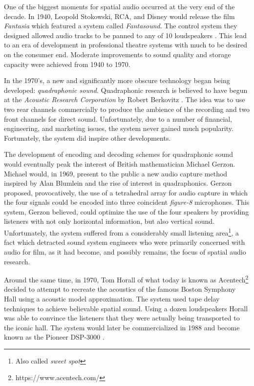 One of the biggest moments for spatial audio occurred at the very end of the decade. In 1940, Leopold Stokowski, RCA, and Disney would release the film \textit{Fantasia} which featured a system called \textit{Fantasound}. The control system they designed allowed audio tracks to be panned to any of 10 loudspeakers \cite{klapholz1991fantasia}. This lead to an era of development in professional theatre systems with much to be desired on the consumer end. Moderate improvements to sound quality and storage capacity were achieved from 1940 to 1970.

In the 1970's, a new and significantly more obscure technology began being developed: \textit{quadraphonic sound}. Quadraphonic research is believed to have begun at the \textit{Acoustic Research Corporation} by Robert Berkovitz \cite{davis2003history}. The idea was to use two rear channels commercially to produce the ambience of the recording and two front channels for direct sound. Unfortunately, due to a number of financial, engineering, and marketing issues, the system never gained much popularity. Fortunately, the system did inspire other developments. 

The development of encoding and decoding schemes for quadraphonic sound would eventually peak the interest of British mathematician Michael Gerzon. Michael would, in 1969, present to the public a new audio capture method inspired by Alan Blumlein and the rise of interest in quadraphonics. Gerzon proposed, provocatively, the use of a tetrahedral array for audio capture in which the four signals could be encoded into three coincident \textit{figure-8} microphones. This system, Gerzon believed, could optimize the use of the four speakers by providing listeners with not only horizontal information, but also vertical sound. Unfortunately, the system suffered from a considerably small listening area\footnote{Also called \textit{sweet spot}}, a fact which detracted sound system engineers who were primarily concerned with audio for film, as it had become, and possibly remains, the focus of spatial audio research. 

Around the same time, in 1970, Tom Horall of what today is known as Acentech\footnote{https://www.acentech.com/} decided to attempt to recreate the acoustics of the famous Boston Symphony Hall using a acoustic model approximation. The system used tape delay techniques to achieve believable spatial sound. Using a dozen loudspeakers Horall was able to convince the listeners that they were actually being transported to the iconic hall. The system would later be commercialized in 1988 and become known as the Pioneer DSP-3000 \cite{davis2003history}. 

